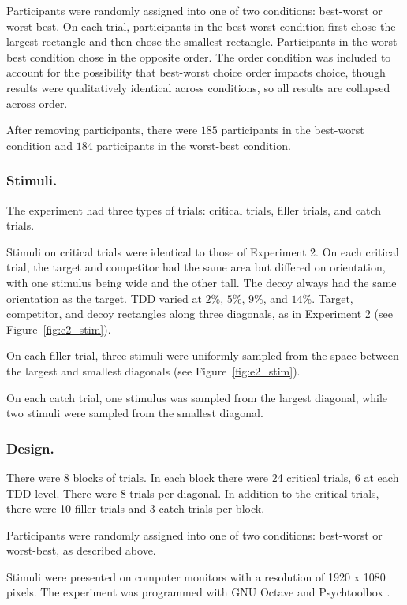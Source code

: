 Participants were randomly assigned into one of two conditions: best-worst or worst-best. On each trial, participants in the best-worst condition first chose the largest rectangle and then chose the smallest rectangle. Participants in the worst-best condition chose in the opposite order. The order condition was included to account for the possibility that best-worst choice order impacts choice, though results were qualitatively identical across conditions, so all results are collapsed across order. 

After removing participants, there were $185$ participants in the best-worst condition and $184$ participants in the worst-best condition.

\subsubsection{Stimuli.}
The experiment had three types of trials: critical trials, filler trials, and catch trials. 

Stimuli on critical trials were identical to those of Experiment 2. On each critical trial, the target and competitor had the same area but differed on orientation, with one stimulus being wide and the other tall. The decoy always had the same orientation as the target. TDD varied at $2\%$, $5\%$, $9\%$, and $14\%$. Target, competitor, and decoy rectangles along three diagonals, as in Experiment 2 (see Figure~\ref{fig:e2_stim}). 

On each filler trial, three stimuli were uniformly sampled from the space between the largest and smallest diagonals (see Figure~\ref{fig:e2_stim}).

On each catch trial, one stimulus was sampled from the largest diagonal, while two stimuli were sampled from the smallest diagonal.

\subsubsection{Design.}
There were 8 blocks of trials. In each block there were 24 critical trials, 6 at each TDD level. There were 8 trials per diagonal. In addition to the critical trials, there were 10 filler trials and 3 catch trials per block.

Participants were randomly assigned into one of two conditions: best-worst or worst-best, as described above. 

Stimuli were presented on computer monitors with a resolution of 1920 x 1080 pixels. The experiment was programmed with GNU Octave and Psychtoolbox \parencite{octave,brainardPsychophysicsToolbox1997}. 

